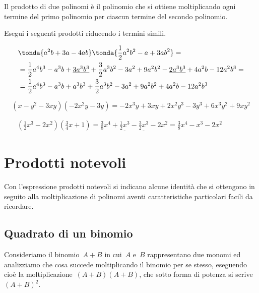 Il prodotto di due polinomi è il polinomio che si ottiene
moltiplicando ogni termine del primo polinomio per ciascun termine del
secondo polinomio.

 \begin{esempio}
 Esegui i seguenti prodotti riducendo i termini simili.

 \begin{enumeratea}
   \item 
\begin{align*}
&\tonda{a^{2}b+3a-4{ab}}\tonda{\frac{1}{2}a^{2}b^{2}-a+3{ab}^{2}}=\\
&=\frac{1}{2}a^{4}b^{3}-a^{3}b+\underline{3a^{3}b^{3}}+\frac{3}{2}a^{3}b^{2}
-3a^{2}+9a^{2}b^{2} -\underline{2a^{3}b^{3}}+4a^{2}b-12a^{2}b^{3}=\\
&=\frac{1}{2}a^{4}b^{3}-a^{3}b+a^{3}b^{3}+\frac{3}{2}a^{3}b^{2}-3a^{2}+9a^{2}
b^{2}+4a^{2}b-12a^{2}b^{3}
 \end{align*}
 \item 
\[\left(x-y^{2}-3{xy}\right)\left(-2x^{2}y-3y\right)=-2x^{3}y+3{xy}+2x^{2}y^
{3}-3y^{3}+6x^{3}y^{2}+9{xy}^{2}\]
 \item 
\begin{align*}
&\left(\frac{1}{2}x^{3}-2x^{2}\right)\left(\frac{3}{4}x+1\right)=
\frac{3}{8}x^{4}+\underline{\frac{1}{2}x^{3}}-
 \underline{\frac{3}{2}x^{3}}-2x^{2}
=\frac{3}{8}x^{4}-x^{3}-2x^{2} \qquad \qquad
\end{align*}
 \end{enumeratea}
 \end{esempio}

\section{Prodotti notevoli}

Con l'espressione prodotti notevoli si indicano alcune
identità che si ottengono in seguito alla moltiplicazione di polinomi
aventi caratteristiche particolari facili da ricordare.

\subsection{Quadrato di un binomio}
\label{subsec:11_prodnot_quadratobinomio}

Consideriamo il binomio~\(A+B\) in cui~\(A\) e~\(B\) rappresentano due monomi ed
analizziamo che cosa succede moltiplicando il binomio per se
stesso, eseguendo cioè la
moltiplicazione~\(\left(A+B\right)\left(A+B\right)\), che sotto forma di 
potenza si scrive~\(\left(A+B\right)^{2}\).

